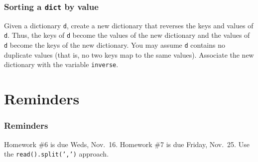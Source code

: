 \documentclass[11pt]{beamer}
\begin{document}
\begin{frame}[fragile]
  \frametitle{Sorting a \texttt{dict} by value}

  Given a dictionary \texttt{d}, create a new dictionary that reverses the keys and values of \texttt{d}.  Thus, the keys of \texttt{d} become the values of the new dictionary and the values of \texttt{d} become the keys of the new dictionary.  You may assume \texttt{d} contains no duplicate values (that is, no two keys map to the same values).  Associate the new dictionary with the variable \texttt{inverse}.
\end{frame}

\section{Reminders}

\begin{frame}
  \frametitle{Reminders}
  \Enlarge

  \begin{itemize}
  \myitem  Homework \#6 is due Weds, Nov.\ 16.
  \myitem  Homework \#7 is due Friday, Nov.\ 25.
  \mysubitem  Use the \texttt{read().split(',')} approach.
  \end{itemize}
\end{frame}
\end{document}
